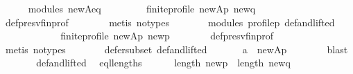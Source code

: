 \begin{isabellebody}
\ \ \ \ \isamarkupfalse%
\ modules\ new{\isacharunderscore}{\kern0pt}A{\isacharunderscore}{\kern0pt}eq\ \isamarkupfalse%
\ {}{\isacharcolon}{\kern0pt}\isanewline
\ \ \ \ \ \ {\isachardoublequoteopen}finite{\isacharunderscore}{\kern0pt}profile\ {\isacharquery}{\kern0pt}new{\isacharunderscore}{\kern0pt}Ap\ {\isacharquery}{\kern0pt}new{\isacharunderscore}{\kern0pt}q{\isachardoublequoteclose}\isanewline
\ \ \ \ \ \ \isamarkupfalse%
\ def{\isacharunderscore}{\kern0pt}presv{\isacharunderscore}{\kern0pt}fin{\isacharunderscore}{\kern0pt}prof\isanewline
\ \ \ \ \ \ \isamarkupfalse%
\ {\isacharparenleft}{\kern0pt}metis\ {\isacharparenleft}{\kern0pt}no{\isacharunderscore}{\kern0pt}types{\isacharparenright}{\kern0pt}{\isacharparenright}{\kern0pt}\isanewline
\ \ \ \ \isamarkupfalse%
\ \isamarkupfalse%
\ modules\ profile{\isacharunderscore}{\kern0pt}p\ def{\isacharunderscore}{\kern0pt}and{\isacharunderscore}{\kern0pt}lifted\isanewline
\ \ \ \ \isamarkupfalse%
\ {}{\isacharcolon}{\kern0pt}\isanewline
\ \ \ \ \ \ {\isachardoublequoteopen}finite{\isacharunderscore}{\kern0pt}profile\ {\isacharquery}{\kern0pt}new{\isacharunderscore}{\kern0pt}Ap\ {\isacharquery}{\kern0pt}new{\isacharunderscore}{\kern0pt}p{\isachardoublequoteclose}\isanewline
\ \ \ \ \ \ \isamarkupfalse%
\ def{\isacharunderscore}{\kern0pt}presv{\isacharunderscore}{\kern0pt}fin{\isacharunderscore}{\kern0pt}prof\isanewline
\ \ \ \ \ \ \isamarkupfalse%
\ {\isacharparenleft}{\kern0pt}metis\ {\isacharparenleft}{\kern0pt}no{\isacharunderscore}{\kern0pt}types{\isacharparenright}{\kern0pt}{\isacharparenright}{\kern0pt}\isanewline
\ \ \ \ \isamarkupfalse%
\ \isamarkupfalse%
\ defer{\isacharunderscore}{\kern0pt}subset\ def{\isacharunderscore}{\kern0pt}and{\isacharunderscore}{\kern0pt}lifted\isanewline
\ \ \ \ \isamarkupfalse%
\ {}{\isacharcolon}{\kern0pt}\ {\isachardoublequoteopen}a\ {\isasymin}\ {\isacharquery}{\kern0pt}new{\isacharunderscore}{\kern0pt}Ap{\isachardoublequoteclose}\isanewline
\ \ \ \ \ \ \isamarkupfalse%
\ blast\isanewline
\ \ \ \ \isamarkupfalse%
\ \isamarkupfalse%
\ def{\isacharunderscore}{\kern0pt}and{\isacharunderscore}{\kern0pt}lifted\ \isamarkupfalse%
\ eql{\isacharunderscore}{\kern0pt}lengths{\isacharcolon}{\kern0pt}\isanewline
\ \ \ \ \ \ {\isachardoublequoteopen}length\ {\isacharquery}{\kern0pt}new{\isacharunderscore}{\kern0pt}p\ {\isacharequal}{\kern0pt}\ length\ {\isacharquery}{\kern0pt}new{\isacharunderscore}{\kern0pt}q{\isachardoublequoteclose}\isanewline

\end{isabellebody}
